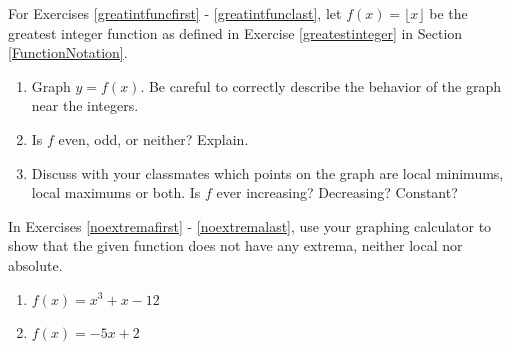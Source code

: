 \pagebreak

For Exercises \ref{greatintfuncfirst} - \ref{greatintfunclast}, let  $f(x) = \lfloor x \rfloor$ be the greatest integer function as defined in Exercise \ref{greatestinteger} in Section \ref{FunctionNotation}.  

\begin{enumerate}
\setcounter{enumi}{\value{HW}}

\item Graph $y = f(x)$.  Be careful to correctly describe the behavior of the graph near the integers.\label{greatintfuncfirst}

\item  Is $f$ even, odd, or neither? Explain.

\item Discuss with your classmates which points on the graph are local minimums, local maximums or both.  Is $f$ ever increasing?  Decreasing?  Constant? \label{greatintfunclast}

\setcounter{HW}{\value{enumi}}
\end{enumerate}

In Exercises \ref{noextremafirst} - \ref{noextremalast}, use your graphing calculator to show that the given  function does not have any extrema, neither local nor absolute.

\begin{multicols}{2}
\begin{enumerate}
\setcounter{enumi}{\value{HW}}

\item $f(x) = x^{3} + x - 12$ \label{noextremafirst}
\item $f(x) = -5x + 2$ \label{noextremalast}

\setcounter{HW}{\value{enumi}}
\end{enumerate}
\end{multicols}

